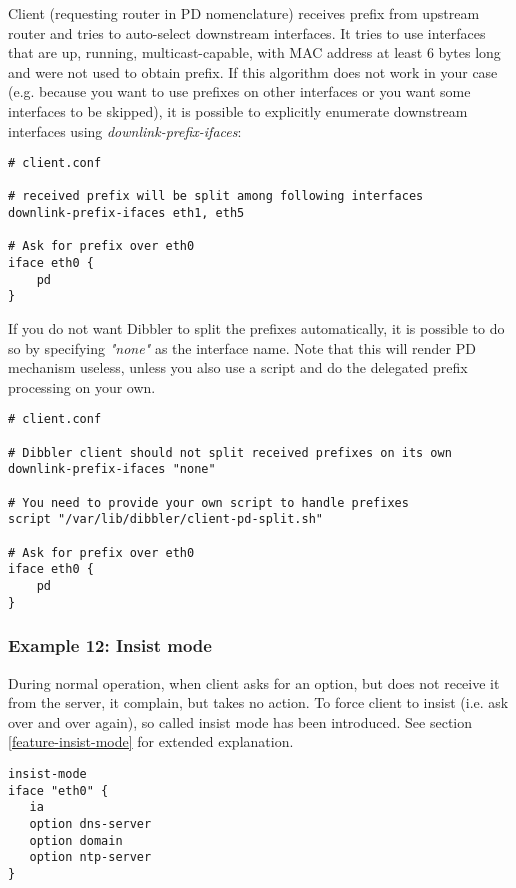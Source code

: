 Client (requesting router in PD nomenclature) receives prefix from
upstream router and tries to auto-select downstream interfaces. It
tries to use interfaces that are up, running, multicast-capable, with
MAC address at least 6 bytes long and were not used to obtain
prefix. If this algorithm does not work in your case (e.g. because you
want to use prefixes on other interfaces or you want some interfaces
to be skipped), it is possible to explicitly enumerate downstream
interfaces using \emph{downlink-prefix-ifaces}:

\begin{lstlisting}
# client.conf

# received prefix will be split among following interfaces
downlink-prefix-ifaces eth1, eth5

# Ask for prefix over eth0
iface eth0 {
    pd
}
\end{lstlisting}

If you do not want Dibbler to split the prefixes automatically, it is
possible to do so by specifying \emph{"none"} as the interface
name. Note that this will render PD mechanism useless, unless you also
use a script and do the delegated prefix processing on your own.

\begin{lstlisting}
# client.conf

# Dibbler client should not split received prefixes on its own
downlink-prefix-ifaces "none"

# You need to provide your own script to handle prefixes
script "/var/lib/dibbler/client-pd-split.sh"

# Ask for prefix over eth0
iface eth0 {
    pd
}
\end{lstlisting}

\subsubsection{Example 12: Insist mode}
\label{example-client-insistmode}
During normal operation, when client asks for an option, but does not
receive it from the server, it complain, but takes no action. To force
client to insist (i.e. ask over and over again), so called insist mode
has been introduced. See section \ref{feature-insist-mode} for
extended explanation.

\begin{lstlisting}
insist-mode
iface "eth0" {
   ia
   option dns-server
   option domain
   option ntp-server
}
\end{lstlisting}

